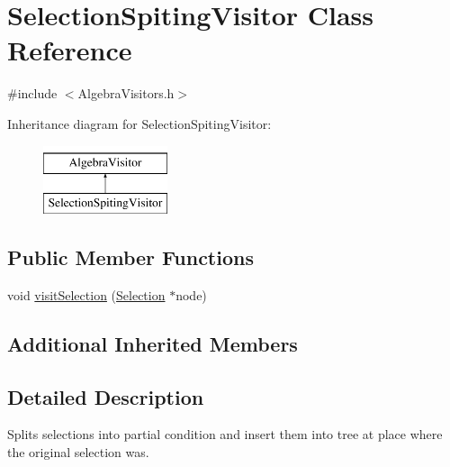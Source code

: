 \hypertarget{class_selection_spiting_visitor}{\section{Selection\+Spiting\+Visitor Class Reference}
\label{class_selection_spiting_visitor}
}


{\ttfamily \#include $<$Algebra\+Visitors.\+h$>$}

Inheritance diagram for Selection\+Spiting\+Visitor\+:\begin{figure}[H]
\begin{center}
\leavevmode
\includegraphics[height=2.000000cm]{class_selection_spiting_visitor}
\end{center}
\end{figure}
\subsection*{Public Member Functions}
\begin{DoxyCompactItemize}
\item 
void \hyperlink{class_selection_spiting_visitor_ac494bc17989d4fe23736f6ce55972aba}{visit\+Selection} (\hyperlink{class_selection}{Selection} $\ast$node)
\end{DoxyCompactItemize}
\subsection*{Additional Inherited Members}


\subsection{Detailed Description}
Splits selections into partial condition and insert them into tree at place where the original selection was. 

